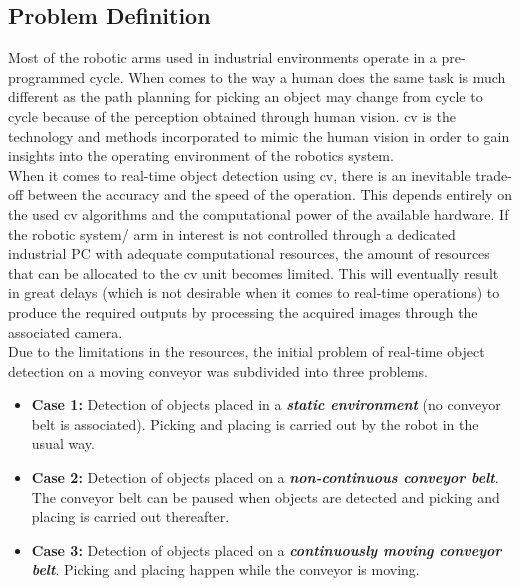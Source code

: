 \documentclass[a4paper,12pt]{report}%
\begin{document}
\subsection{Problem Definition}\label{Problem Definition}
Most of the robotic arms used in industrial environments operate in a pre-programmed cycle. When comes to the way a human does the same task is much different as the path planning for picking an object may change from cycle to cycle because of the perception obtained through human vision. \Ac{cv} is the technology and methods incorporated to mimic the human vision in order to gain insights into the operating environment of the robotics system.\\

When it comes to real-time object detection using \ac{cv}, there is an inevitable trade-off between the accuracy and the speed of the operation. This depends entirely on the used \ac{cv} algorithms and the computational power of the available hardware. If the robotic system/ arm in interest is not controlled through a dedicated industrial PC with adequate computational resources, the amount of resources that can be allocated to the \ac{cv} unit becomes limited.  This will eventually result in great delays (which is not desirable when it comes to real-time operations) to produce the required outputs by processing the acquired images through the associated camera.\\

Due to the limitations in the resources, the initial problem of real-time object detection on a moving conveyor was subdivided into three problems.

\begin{itemize}
	\item \textbf{Case 1:} Detection of objects placed in a \textbf{\textit{static environment}} (no conveyor belt is associated). Picking and placing is carried out by the robot in the usual way.
	
	\item  \textbf{Case 2:} Detection of objects placed on a \textbf{\textit{non-continuous conveyor belt}}. The conveyor belt can be paused when objects are detected and picking and placing is carried out thereafter.
	
	\item \textbf{Case 3:} Detection of objects placed on a \textbf{\textit{continuously moving conveyor belt}}. Picking and placing happen while the conveyor is moving.
\end{itemize}
\end{document}
